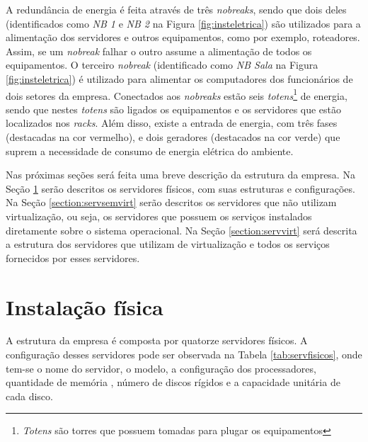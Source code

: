 A redundância de energia é feita através de três \textit{nobreaks}, sendo que dois deles (identificados como \textit{NB 1} e \textit{NB 2} na 
Figura \ref{fig:insteletrica}) são utilizados para a alimentação dos servidores e outros equipamentos, como por exemplo, roteadores. Assim, se um 
\textit{nobreak} falhar o outro assume a alimentação de todos os equipamentos. O terceiro \textit{nobreak} (identificado como \textit{NB Sala} 
na Figura \ref{fig:insteletrica}) é utilizado para alimentar os computadores dos funcionários de dois setores da empresa. Conectados aos 
\textit{nobreaks} estão seis \textit{totens}\footnote[1]{\textit{Totens} são torres que possuem tomadas para plugar os equipamentos} de energia, 
sendo que nestes \textit{totens} são ligados os equipamentos e os servidores que estão localizados nos \textit{racks}. Além disso, existe a 
entrada de energia, com três fases (destacadas na cor vermelho), e dois geradores (destacados na cor verde) que suprem a necessidade de consumo 
de energia elétrica do ambiente.

Nas próximas seções será feita uma breve descrição da estrutura da empresa. Na Seção \ref{section:fisico} serão descritos os servidores físicos, 
com suas estruturas e configurações. Na Seção \ref{section:servsemvirt} serão descritos os servidores que não utilizam virtualização, ou seja, 
os servidores que possuem os serviços instalados diretamente sobre o sistema operacional. Na Seção \ref{section:servvirt} será descrita a 
estrutura dos servidores que utilizam de virtualização e todos os serviços fornecidos por esses servidores.

\section{Instalação física}
\label{section:fisico}

A estrutura da empresa é composta por quatorze servidores físicos. A configuração desses servidores pode ser observada na 
Tabela \ref{tab:servfisicos}, onde tem-se o nome do servidor, o modelo, a configuração dos processadores, quantidade de memória
, número de discos rígidos e a capacidade unitária de cada disco.

